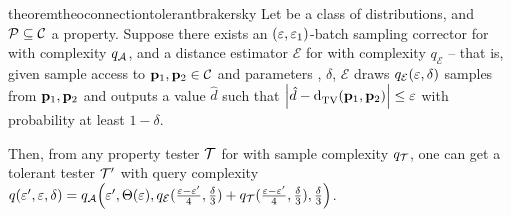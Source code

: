 \begin{restatable}{theorem}{theoconnectiontolerantbrakersky}\label{theo:connection:corrector:testing}
Let \class be a class of distributions, and $\mathcal{P}\subseteq\mathcal{C}$ a property. Suppose there exists an $(\varepsilon,\varepsilon_1)$-batch sampling corrector \Algo for \property with complexity $q_\mathcal{A}$, and a distance estimator $\mathcal{E}$ for \class with complexity $q_{\mathcal{E}}$ -- that is, given sample access to $\mathbf{p}_1,\mathbf{p}_2\in\mathcal{C}$ and parameters \eps, $\delta$, $\mathcal{E}$ draws $q_{\mathcal{E}}(\varepsilon,\delta)$ samples from $\mathbf{p}_1,\mathbf{p}_2$ and outputs a value $\hat{d}$ such that $\left\lvert  \hat{d}-{\operatorname{d}_{\textrm{TV}}^{}\!\left({\mathbf{p}_1, \mathbf{p}_2}\right)}  \right\rvert \leq \varepsilon$ with probability at least $1-\delta$.

Then, from any property tester $\mathcal{T}$ for \property with sample complexity $q_\mathcal{T}$, one can get a tolerant tester $\mathcal{T}^\prime$ with query complexity $q(\eps^\prime,\eps,\delta)=q_\Algo\!\left(\eps^\prime, \bigTheta{\eps}, q_{\mathcal{E}}(\frac{\eps-\eps^\prime}{4},\frac{\delta}{3})+q_\Tester(\frac{\eps-\eps^\prime}{4},\frac{\delta}{3}), \frac{\delta}{3}\right)$.
\end{restatable}
